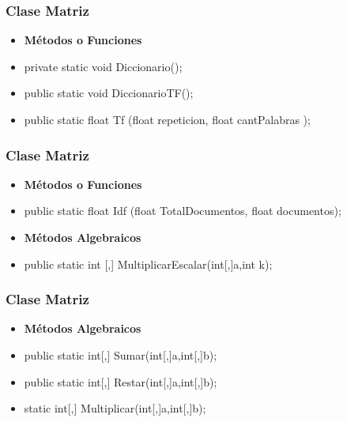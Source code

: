\documentclass[17pt]{beamer}
\begin{document}
   \begin{frame}
    \frametitle{Clase Matriz}
    \begin{itemize}
        \item[] \textbf{Métodos o Funciones}
        \item private static void Diccionario();
        \item public static void DiccionarioTF();
        \item public static float Tf (float repeticion, float cantPalabras );
      \end{itemize}
       \end{frame}
        \begin{frame}
            \frametitle{Clase Matriz}
            \begin{itemize}
        \item[] \textbf{Métodos o Funciones} 
        \item public static float Idf (float TotalDocumentos, float documentos);
        \end{itemize}
        \begin{itemize}
            \item[] \textbf{Métodos Algebraicos}
            \item public static int [,] MultiplicarEscalar(int[,]a,int k);
            \end{itemize}
            \end{frame}
        
   
   \begin{frame}
    \frametitle{Clase Matriz}
    \begin{itemize}
        \item[] \textbf{Métodos Algebraicos}
          \item public static int[,] Sumar(int[,]a,int[,]b); 
        \item public static int[,] Restar(int[,]a,int[,]b); 
        \item static int[,] Multiplicar(int[,]a,int[,]b); 
    \end{itemize}
\end{frame}
\end{document}

